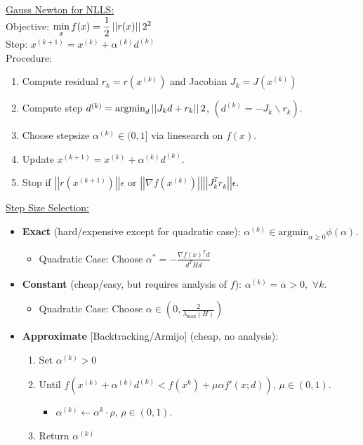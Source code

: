 \documentclass{article}
\newcommand{\norm}[2]{\left\lvert\left\lvert#1\right\rvert\right\rvert}
\newcommand{\sheader}[1]{\underline{#1:}}
\newcommand{\ds}{\displaystyle}
\begin{document}
\sheader{Gauss Newton for NLLS}\\
Objective: $\ds \min_{x} f(x) = \frac{1}{2} \norm{r(x)}_2^2$\\
Step: $\ds x^{(k + 1)} = x^{(k)} + \alpha^{(k)} d^{(k)}$\\
Procedure:
\begin{enumerate}
    \item Compute residual $r_k = r(x^{(k)})$ and Jacobian $J_k = J(x^{(k)})$
    \item Compute step $d^{(k)} = \textrm{argmin}_d \norm{J_k d + r_k}^2$, $(d^{(k)} = -J_k \backslash r_k)$.
    \item Choose stepsize $\alpha^{(k)} \in (0, 1]$ via linesearch on $f(x)$.
    \item Update $x^{(k + 1)} = x^{(k)} + \alpha^{(k)}d^{(k)}$.
    \item Stop if $\norm{r(x^{(k + 1)})} < \epsilon$ or $\norm{\nabla f(x^{(k)})} = \norm{J_k^T r_k} < \epsilon$.
\end{enumerate}
\sheader{Step Size Selection}
\begin{itemize}
    \item \textbf{Exact} (hard/expensive except for quadratic case): $\ds \alpha^{(k)} \in \textrm{argmin}_{\alpha \geq 0} \phi(\alpha)$.
    \begin{itemize}
        \item Quadratic Case: Choose $\ds \alpha^* = - \frac{\nabla f(x)^T d}{d^T Hd}$
    \end{itemize}
    \item \textbf{Constant} (cheap/easy, but requires analysis of $f$): $\ds \alpha^{(k)} = \overline{\alpha} > 0, \,\, \forall k$.
    \begin{itemize}
        \item Quadratic Case: Choose $\ds \alpha \in \left(0, \frac{2}{\lambda_{\textrm{max}}(H)}\right)$
    \end{itemize}
    \item \textbf{Approximate} [Backtracking/Armijo] (cheap, no analysis):
    \begin{enumerate}
        \item Set $\alpha^{(k)} > 0$
        \item Until $f(x^{(k)} + \alpha^{(k)}d^{(k)} < f(x^k) + \mu \alpha f'(x;d))$, $\mu \in (0, 1)$.
        \begin{itemize}
            \item $\alpha^{(k)} \leftarrow \alpha^k \cdot \rho$, $\rho \in (0, 1)$.
        \end{itemize}
        \item Return $\alpha^{(k)}$
    \end{enumerate}

\end{itemize}
\end{document}
